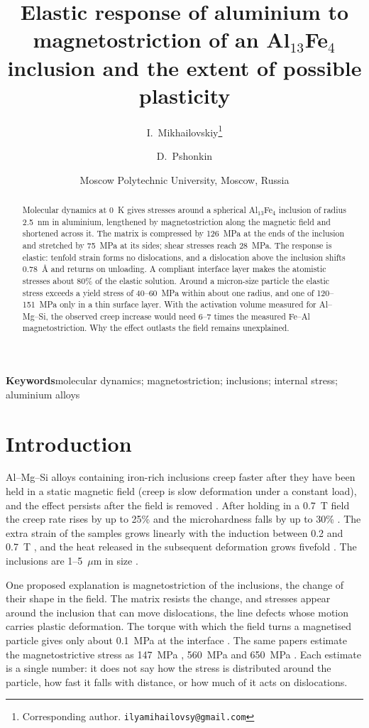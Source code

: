 \documentclass[11pt,a4paper]{article}
\title{Elastic response of aluminium to magnetostriction of an Al$_{13}$Fe$_4$
inclusion and the extent of possible plasticity}
\author{I.~Mikhailovskiy\thanks{Corresponding author.
\texttt{ilyamihailovsy@gmail.com}} \and D.~Pshonkin}
\date{Moscow Polytechnic University, Moscow, Russia}
\begin{document}
\maketitle

\begin{abstract}
Molecular dynamics at 0~K gives stresses around a spherical
Al$_{13}$Fe$_4$ inclusion of radius 2.5~nm in aluminium, lengthened by
magnetostriction along the magnetic field and shortened across it. The
matrix is compressed by 126~MPa at the ends of the inclusion and
stretched by 75~MPa at its sides; shear stresses reach
28~MPa. The response is elastic: tenfold strain forms no
dislocations, and a dislocation above the inclusion shifts
0.78~\AA{} and returns on unloading. A compliant interface layer
makes the atomistic stresses about 80\% of the elastic solution.
Around a micron-size particle the elastic stress exceeds a yield stress of
40--60~MPa within about one radius, and one of 120--151~MPa only in a thin
surface layer. With the activation volume
measured for Al--Mg--Si, the observed creep increase would need 6--7 times
the measured Fe--Al magnetostriction. Why the effect outlasts the field
remains unexplained.
\end{abstract}

\noindent\textbf{Keywords}\quad molecular dynamics; magnetostriction;
inclusions; internal stress; aluminium alloys

\section{Introduction}

Al--Mg--Si alloys containing iron-rich inclusions creep faster after they
have been held in a static magnetic field (creep is slow deformation under a
constant load), and the effect persists after the field is removed
\cite{Skvortsov2019JAP,Skvortsov2019PSS,Friha2024JMMM,Nikolaev2025SciRep}.
After holding in a 0.7~T field the creep rate rises by up to 25\% and the
microhardness falls by up to 30\% \cite{Skvortsov2019JAP}. The extra strain
of the samples grows linearly with the induction between 0.2 and 0.7~T
\cite{Friha2024JMMM}, and the heat released in the subsequent deformation
grows fivefold \cite{Pshonkin2025ZL}. The inclusions are 1--5~$\mu$m in size
\cite{Skvortsov2019JAP,Pshonkin2025ZL}.

One proposed explanation is magnetostriction of the inclusions, the change of
their shape in the field. The matrix resists the change, and stresses appear
around the inclusion that can move dislocations, the line defects whose
motion carries plastic deformation. The torque with which the field turns a
magnetised particle gives only about 0.1~MPa at the interface
\cite{Skvortsov2019JAP}. The same papers estimate the magnetostrictive stress
as 147~MPa \cite{Friha2024JMMM}, 560~MPa \cite{Skvortsov2019JAP} and
650~MPa \cite{Friha2023PSS}. Each estimate is a single number: it does not
say how the stress is distributed around the particle, how fast it falls
with distance, or how much of it acts on dislocations.
\end{document}
